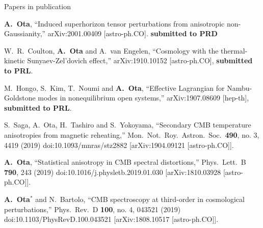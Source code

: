 \documentclass[a4paper]{resume} %
\begin{document}
\begin{rSection}{Papers in publication}


\begin{etaremune}

\item
  {\bf A.~Ota},
  ``Induced superhorizon tensor perturbations from anisotropic non-Gaussianity,''
  arXiv:2001.00409 [astro-ph.CO]. {\bf submitted to PRD}

\item
  W.~R.~Coulton, {\bf A.~Ota} and A.~van Engelen,
  ``Cosmology with the thermal-kinetic Sunyaev-Zel'dovich effect,''
  arXiv:1910.10152 [astro-ph.CO], {\bf submitted to PRL}.

\item
  M.~Hongo, S.~Kim, T.~Noumi and {\bf A.~Ota},
  ``Effective Lagrangian for Nambu-Goldstone modes in nonequilibrium open systems,''
  arXiv:1907.08609 [hep-th], {\bf submitted to PRL}.


\item
  S.~Saga, A.~Ota, H.~Tashiro and S.~Yokoyama,
  ``Secondary CMB temperature anisotropies from magnetic reheating,''
  Mon.\ Not.\ Roy.\ Astron.\ Soc.\  {\bf 490}, no. 3, 4419 (2019)
  doi:10.1093/mnras/stz2882
  [arXiv:1904.09121 [astro-ph.CO]].



\item  
  {\bf A.~Ota},
  ``Statistical anisotropy in CMB spectral distortions,''
  Phys.\ Lett.\ B {\bf 790}, 243 (2019)
  doi:10.1016/j.physletb.2019.01.030
  [arXiv:1810.03928 [astro-ph.CO]].
  

\item
  {\bf A.~Ota$^*$} and N.~Bartolo,
  ``CMB spectroscopy at third-order in cosmological perturbations,''
  Phys.\ Rev.\ D {\bf 100}, no. 4, 043521 (2019)
  doi:10.1103/PhysRevD.100.043521
  [arXiv:1808.10517 [astro-ph.CO]].
  
  
  

\end{etaremune}
\end{rSection}
\end{document}
